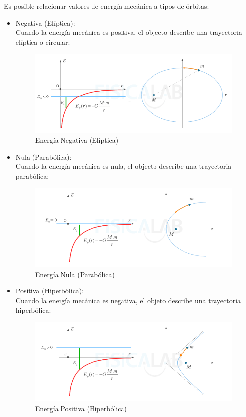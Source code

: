 \documentclass[arial,a4paper,print]{article}
\begin{document}
Es posible relacionar valores de energía mecánica a tipos de órbitas:
\begin{itemize}
	\item Negativa (Elíptica):\\
	Cuando la energía mecánica es positiva, el objecto describe una trayectoria elíptica o circular:
	\begin{figure}[h]
		\centering
		\includegraphics[width=0.6\linewidth]{energia-mecanica-negativa}
		\caption{Energía Negativa (Elíptica)}
		\label{fig:energia-mecanica-positiva}
	\end{figure}

	\item Nula (Parabólica):\\
	Cuando la energía mecánica es nula, el objecto describe una trayectoria parabólica:
	\begin{figure}[h]
		\centering
		\includegraphics[width=0.6\linewidth]{energia-mecanica-nula}
		\caption{Energía Nula (Parabólica)}
		\label{fig:energia-mecanica-nula}
	\end{figure}

\pagebreak
	\item Positiva (Hiperbólica):\\
	Cuando la energía mecánica es negativa, el objeto describe una trayectoria hiperbólica:
	\begin{figure}[h]
		\centering
		\includegraphics[width=0.6\linewidth]{energia-mecanica-positiva}
		\caption{Energía Positiva (Hiperbólica)}
		\label{fig:energia-mecanica-negativa}
	\end{figure}
\end{itemize}
\end{document}
